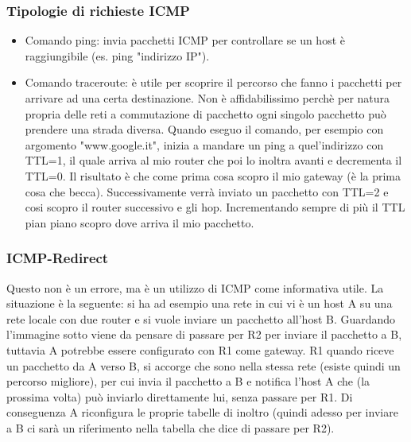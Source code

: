 \subsubsection{Tipologie di richieste ICMP}
\begin{itemize}
  \item Comando ping: invia pacchetti ICMP per controllare se un host è raggiungibile (es. ping "indirizzo IP").
  \item Comando traceroute: è utile per scoprire il percorso che fanno i pacchetti per arrivare ad una certa destinazione. Non è affidabilissimo perchè per natura propria delle reti a commutazione di pacchetto ogni singolo pacchetto può prendere una strada diversa. Quando eseguo il comando, per esempio con argomento "www.google.it", inizia a mandare un ping a quel'indirizzo con TTL=1, il quale arriva al mio router che poi lo inoltra avanti e decrementa il TTL=0. Il risultato è che come prima cosa scopro il mio gateway (è la prima cosa che becca). Successivamente verrà inviato un pacchetto con TTL=2 e cosi scopro il router successivo e gli hop. Incrementando sempre di più il TTL pian piano scopro dove arriva il mio pacchetto.
\end{itemize}
\subsubsection{ICMP-Redirect}
Questo non è un errore, ma è un utilizzo di ICMP come informativa utile. La situazione è la seguente: si ha ad esempio una rete in cui vi è un host A su una rete locale con due router e si vuole inviare un pacchetto all’host B. Guardando l’immagine sotto viene da pensare di passare per R2 per inviare il pacchetto a B, tuttavia A potrebbe essere configurato con R1 come gateway. R1 quando riceve un pacchetto da A verso B, si accorge che sono nella stessa rete (esiste quindi un percorso migliore), per cui invia il pacchetto a B e notifica l’host A che (la prossima volta) può inviarlo direttamente lui, senza passare per R1. Di conseguenza A riconfigura le proprie tabelle di inoltro (quindi adesso per inviare a B ci sarà un riferimento nella tabella che dice di passare per R2).
